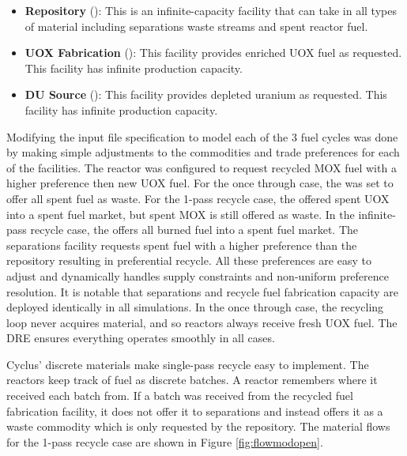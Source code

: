 \begin{itemize}
    \item \textbf{Repository} (): This is an
        infinite-capacity facility that can take in all types of material
        including separations waste streams and spent reactor fuel.

    \item \textbf{UOX Fabrication} (): This facility
        provides enriched UOX fuel as requested.  This facility has infinite
        production capacity.

    \item \textbf{DU Source} (): This facility
        provides depleted uranium as requested. This facility has infinite
        production capacity.

\end{itemize}

Modifying the input file specification to model each of the 3 fuel cycles was
done by making simple adjustments to the commodities and trade preferences for
each of the facilities.  The reactor was configured to request recycled MOX
fuel with a higher preference then new UOX fuel. For the once through case,
the  was set to offer all spent fuel as waste.  For the 1-pass
recycle case, the  offered spent UOX into a spent fuel market,
but spent MOX is still offered as waste.  In the infinite-pass recycle case,
the  offers all burned fuel into a spent fuel market. The
separations facility requests spent fuel with a higher preference than the
repository resulting in preferential recycle.  All these preferences are easy
to adjust and \Cyclus dynamically handles supply constraints and non-uniform
preference resolution.  It is notable that separations and recycle fuel
fabrication capacity are deployed identically in all simulations.  In the once
through case, the recycling loop never acquires material, and so reactors
always receive fresh UOX fuel.  The \gls{DRE} ensures everything operates
smoothly in all cases.

Cyclus' discrete materials make single-pass recycle easy to implement.  The
reactors keep track of fuel as discrete batches. A reactor remembers where it
received each batch from.  If a batch was received from the recycled fuel
fabrication facility, it does not offer it to separations and instead offers
it as a waste commodity which is only requested by the repository.  The
material flows for the 1-pass recycle case are shown in Figure
\ref{fig:flowmodopen}.

